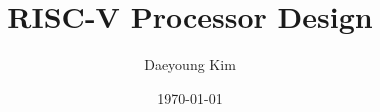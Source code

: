 \documentclass[11pt]{article}
\begin{document}
\title{RISC-V Processor Design}
\author{Daeyoung Kim}
\date{\today}
\maketitle





\end{document}
